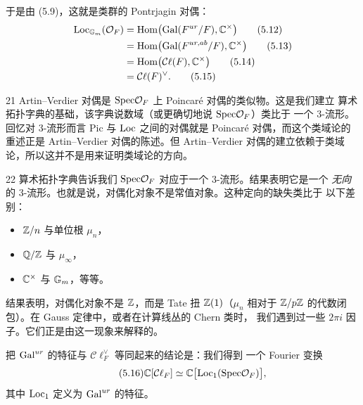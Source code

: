 于是由 (5.9)，这就是类群的 Pontrjagin 对偶：
\begin{align}
\mathrm{Loc}_{\mathbb{G}_{m}}(\mathcal{O}_{F})&=\mathrm{Hom}\bigl(\mathrm{Gal}(F^{ur}/F),\mathbb{C}^{\times}\bigr)\tag{5.12}\\
&=\mathrm{Hom}\bigl(\mathrm{Gal}(F^{ur,ab}/F),\mathbb{C}^{\times}\bigr)\tag{5.13}\\
&=\mathrm{Hom}\bigl(\mathcal{C}\ell(F),\mathbb{C}^{\times}\bigr)\tag{5.14}\\
&=\mathcal{C}\ell(F)^{\vee}.\tag{5.15}
\end{align}

\begin{srcrem}{21}
Artin--Verdier 对偶是 $\mathrm{Spec}\mathcal{O}_{F}$ 上 Poincaré 对偶的类似物。这是我们建立
算术拓扑字典的基础，该字典说数域（或更确切地说 $\mathrm{Spec}\mathcal{O}_{F}$）类比于
一个 3-流形。回忆对 3-流形而言 $\mathrm{Pic}$ 与 $\mathrm{Loc}$ 之间的对偶就是
Poincaré 对偶，而这个类域论的重述正是 Artin--Verdier 对偶的陈述。但
Artin--Verdier 对偶的建立依赖于类域论，所以这并不是用来证明类域论的方向。
\end{srcrem}

\begin{srcrem}{22}
算术拓扑字典告诉我们 $\mathrm{Spec}\mathcal{O}_{F}$ 对应于一个 3-流形。结果表明它是一个
\emph{无向}的 3-流形。也就是说，对偶化对象不是常值对象。这种定向的缺失类比于
以下差别：
\begin{itemize}
\item $\mathbb{Z}/n$ 与单位根 $\mu_{n}$，
\item $\mathbb{Q}/\mathbb{Z}$ 与 $\mu_{\infty}$，
\item $\mathbb{C}^{\times}$ 与 $\mathbb{G}_{m}$，等等。
\end{itemize}
结果表明，对偶化对象不是 $\mathbb{Z}$，而是 Tate 扭 $\mathbb{Z}(1)$（$\mu_{n}$ 相对于
$\mathbb{Z}/p\mathbb{Z}$ 的代数闭包）。在 Gauss 定律中，或者在计算线丛的 Chern 类时，
我们遇到过一些 $2\pi i$ 因子。它们正是由这一现象来解释的。
\end{srcrem}


把 $\mathrm{Gal}^{ur}$ 的特征与 $\mathcal{C}\ell^{\vee}_{F}$ 等同起来的结论是：我们得到
一个 Fourier 变换
\begin{equation}\tag{5.16}
\mathbb{C}[\mathcal{C}\ell_{F}]\simeq\mathbb{C}\bigl[\mathrm{Loc}_{1}(\mathrm{Spec}\mathcal{O}_{F})\bigr],
\end{equation}
其中 $\mathrm{Loc}_{1}$ 定义为 $\mathrm{Gal}^{ur}$ 的特征。

